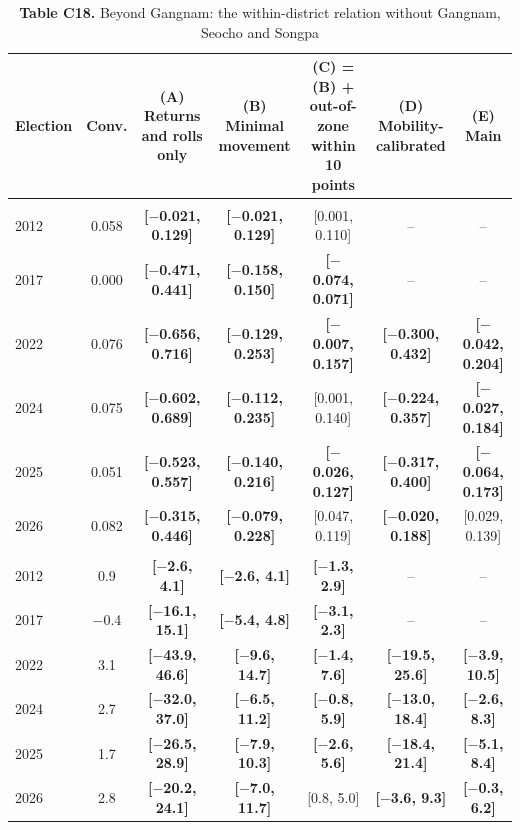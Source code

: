 \begin{table}[!htbp]
\centering
\scriptsize
\setlength{\tabcolsep}{3.5pt}
\caption*{\textbf{Table C18.} Beyond Gangnam: the within-district relation without Gangnam, Seocho and Songpa}
\begin{tabularx}{\linewidth}{lcCCCCC}
\toprule
Election & Conv. & (A) Returns and rolls only & (B) Minimal movement & (C) = (B) + out-of-zone within 10 points & (D) Mobility-calibrated & (E) Main \\
\midrule
\addlinespace[3pt] \\
2012 & 0.058 & \textbf{[$-$0.021, 0.129]} & \textbf{[$-$0.021, 0.129]} & [0.001, 0.110] & -- & -- \\
2017 & 0.000 & \textbf{[$-$0.471, 0.441]} & \textbf{[$-$0.158, 0.150]} & \textbf{[$-$0.074, 0.071]} & -- & -- \\
2022 & 0.076 & \textbf{[$-$0.656, 0.716]} & \textbf{[$-$0.129, 0.253]} & \textbf{[$-$0.007, 0.157]} & \textbf{[$-$0.300, 0.432]} & \textbf{[$-$0.042, 0.204]} \\
2024 & 0.075 & \textbf{[$-$0.602, 0.689]} & \textbf{[$-$0.112, 0.235]} & [0.001, 0.140] & \textbf{[$-$0.224, 0.357]} & \textbf{[$-$0.027, 0.184]} \\
2025 & 0.051 & \textbf{[$-$0.523, 0.557]} & \textbf{[$-$0.140, 0.216]} & \textbf{[$-$0.026, 0.127]} & \textbf{[$-$0.317, 0.400]} & \textbf{[$-$0.064, 0.173]} \\
2026 & 0.082 & \textbf{[$-$0.315, 0.446]} & \textbf{[$-$0.079, 0.228]} & [0.047, 0.119] & \textbf{[$-$0.020, 0.188]} & [0.029, 0.139] \\
\addlinespace[3pt] \\
2012 & 0.9 & \textbf{[$-$2.6, 4.1]} & \textbf{[$-$2.6, 4.1]} & \textbf{[$-$1.3, 2.9]} & -- & -- \\
2017 & $-$0.4 & \textbf{[$-$16.1, 15.1]} & \textbf{[$-$5.4, 4.8]} & \textbf{[$-$3.1, 2.3]} & -- & -- \\
2022 & 3.1 & \textbf{[$-$43.9, 46.6]} & \textbf{[$-$9.6, 14.7]} & \textbf{[$-$1.4, 7.6]} & \textbf{[$-$19.5, 25.6]} & \textbf{[$-$3.9, 10.5]} \\
2024 & 2.7 & \textbf{[$-$32.0, 37.0]} & \textbf{[$-$6.5, 11.2]} & \textbf{[$-$0.8, 5.9]} & \textbf{[$-$13.0, 18.4]} & \textbf{[$-$2.6, 8.3]} \\
2025 & 1.7 & \textbf{[$-$26.5, 28.9]} & \textbf{[$-$7.9, 10.3]} & \textbf{[$-$2.6, 5.6]} & \textbf{[$-$18.4, 21.4]} & \textbf{[$-$5.1, 8.4]} \\
2026 & 2.8 & \textbf{[$-$20.2, 24.1]} & \textbf{[$-$7.0, 11.7]} & [0.8, 5.0] & \textbf{[$-$3.6, 9.3]} & \textbf{[$-$0.3, 6.2]} \\
\bottomrule
\end{tabularx}
\par{}
\end{table}
